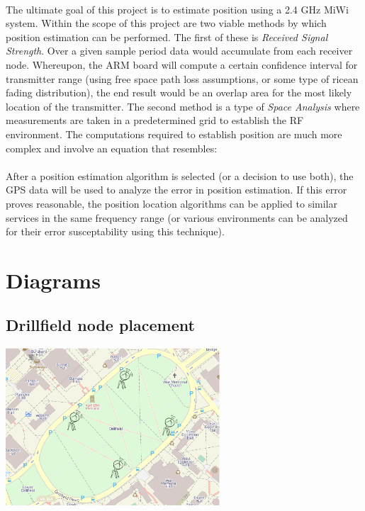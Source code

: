 \documentclass{article}
\begin{document}
\paragraph*{}
The ultimate goal of this project is to estimate position using a 2.4 GHz MiWi system.  Within the scope of this project are two viable methods by which position estimation can be performed.  The first of these is \textit{Received Signal Strength}.  Over a given sample period data would accumulate from each receiver node.  Whereupon, the ARM board will compute a certain confidence interval for transmitter range (using free space path loss assumptions, or some type of ricean fading distribution), the end result would be an overlap area for the most likely location of the transmitter.  The second method is a type of \textit{Space Analysis} where measurements are taken in a predetermined grid to establish the RF environment.  The computations required to establish position are much more complex and involve an equation that resembles:
\paragraph*{}
After a position estimation algorithm is selected (or a decision to use both), the GPS data will be used to analyze the error in position estimation.  If this error proves reasonable, the position location algorithms can be applied to similar services in the same frequency range (or various environments can be analyzed for their error susceptability using this technique).

\section*{Diagrams}
\subsection*{Drillfield node placement}
\includegraphics[width=0.6\textwidth]{node_placement}
\end{document}
